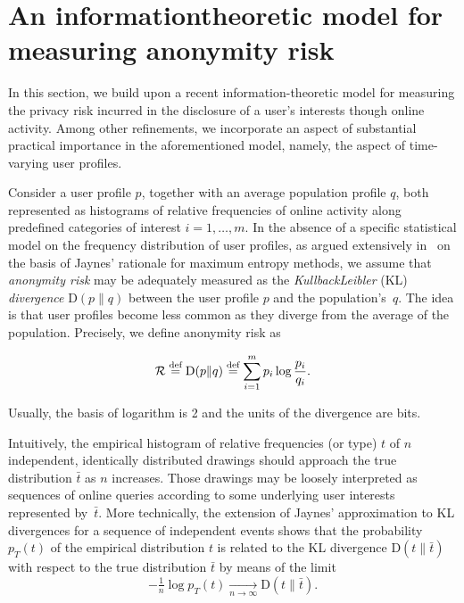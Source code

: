 \section{An information\hyph theoretic model for measuring anonymity risk}
\label{sec:1-1}

\noindent
In this section, we build upon a recent information-theoretic model for measuring the privacy risk incurred in the disclosure of a user's interests though online activity. Among other refinements, we incorporate an aspect of substantial practical importance in the aforementioned model, namely, the aspect of time-varying user profiles.
 
Consider a user profile $p$, together with an average population profile $q$, both represented as histograms of relative frequencies of online activity along predefined categories of interest $i=1,\dots,m$. In the absence of a specific statistical model on the frequency distribution of user profiles, as argued extensively in~\cite{Rebollo10IT,Rebollo11SecTech,parra2014measuring} on the basis of Jaynes' rationale for maximum entropy methods, we assume that \emph{anonymity risk} may be adequately measured as the \emph{Kullback\hyph Leibler} (KL) \emph{divergence} $\mathrm{D}(p\|q)$ between the user profile $p$ and the population's~$q$. The idea is that user profiles become less common as they diverge from the average of the population. Precisely, we define anonymity risk as

\begin{equation*}
\mathcal{R}\stackrel{\text{def}}{=}\mathrm{D}(p\|q)\stackrel{\text{def}}{=}\sum_{i=1}^m p_i\log \frac{p_i}{q_i}.
\end{equation*}

Usually, the basis of logarithm is 2 and the units of the divergence are bits.

Intuitively, the empirical histogram of relative frequencies (or type) $t$ of $n$ independent, identically distributed drawings should approach the true distribution $\bar{t}$ as $n$ increases. Those drawings may be loosely interpreted as sequences of online queries according to some underlying user interests represented by~$\bar{t}$. More technically, the extension of Jaynes' approximation to KL divergences for a sequence of independent events shows that the probability $p_T(t)$ of the empirical distribution $t$ is related to the KL divergence $\mathrm{D}(t\|\bar{t})$ with respect to the true distribution $\bar{t}$ by means of the limit
\begin{equation*}
-\tfrac{1}{n}\log p_T(t)\xrightarrow[n\to\infty]{}\mathrm{D}(t\|\bar{t}).
\end{equation*}

